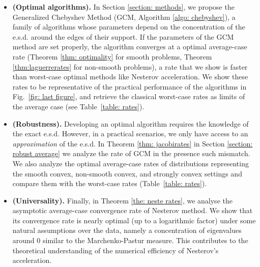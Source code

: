 \documentclass{article}
\begin{document}
\begin{itemize}[leftmargin=*]
    \item \textbf{(Optimal algorithms).} In Section \ref{section: methods}, we propose the Generalized Chebyshev Method (GCM, Algorithm \ref{algo: chebyshev}), a family of algorithms whose parameters depend on the concentration of the e.s.d. around the edges of their support. If the parameters of the GCM method are set properly, the algorithm converges at a optimal average-case rate (Theorem \ref{thm: optimality} for smooth problems, Theorem \ref{thm:laguerrerates} for non-smooth problems), a rate that we show is faster than worst-case optimal methods like Nesterov acceleration. We show these rates to be representative of the practical performance of the algorithms in Fig.~\ref{fig: last figure}, and retrieve the classical worst-case rates as limits of the average case (see Table~\ref{table: rates}).
    \item \textbf{(Robustness).} Developing an optimal algorithm requires the knowledge of the exact e.s.d. However, in a practical scenarios, we only have access to an \textit{approximation} of the e.s.d. In Theorem \ref{thm: jacobirates} in Section \ref{section: robust average} we analyze the rate of GCM in the presence such mismatch. We also analyze the optimal average-case rates of distributions representing the smooth convex, non-smooth convex, and strongly convex settings and compare them with the worst-case rates (Table~\ref{table: rates}).
    \item \textbf{(Universality).} Finally, in Theorem \ref{the: neste rates}, we analyse the asymptotic average-case convergence rate of Nesterov method. We show that its convergence rate is nearly optimal (up to a logarithmic factor) under some natural assumptions over the data, namely a concentration of eigenvalues around $0$ similar to the Marchenko-Pastur measure. This contributes to the theoretical understanding of the numerical efficiency of Nesterov's acceleration.
\end{itemize}


\end{document}
